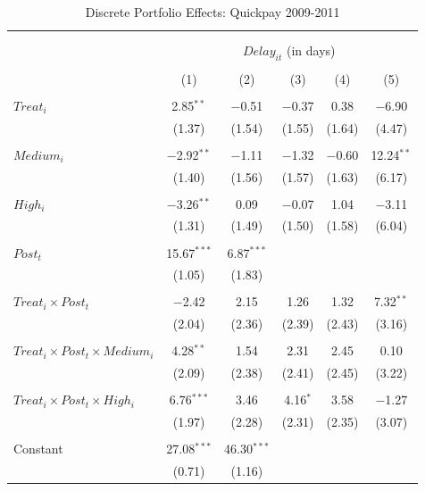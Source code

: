 \documentclass[
]{article}
\begin{document}
\begin{table}[H] \centering 
  \caption{Discrete Portfolio Effects: Quickpay 2009-2011} 
  \label{} 
\small 
\begin{tabular}{@{\extracolsep{-2pt}}lccccc} 
\\[-1.8ex]\hline 
\hline \\[-1.8ex] 
\\[-1.8ex] & \multicolumn{5}{c}{$Delay_{it}$ (in days)} \\ 
\\[-1.8ex] & (1) & (2) & (3) & (4) & (5)\\ 
\hline \\[-1.8ex] 
 $Treat_i$ & 2.85$^{**}$ & $-$0.51 & $-$0.37 & 0.38 & $-$6.90 \\ 
  & (1.37) & (1.54) & (1.55) & (1.64) & (4.47) \\ 
  & & & & & \\ 
 $Medium_i$ & $-$2.92$^{**}$ & $-$1.11 & $-$1.32 & $-$0.60 & 12.24$^{**}$ \\ 
  & (1.40) & (1.56) & (1.57) & (1.63) & (6.17) \\ 
  & & & & & \\ 
 $High_i$ & $-$3.26$^{**}$ & 0.09 & $-$0.07 & 1.04 & $-$3.11 \\ 
  & (1.31) & (1.49) & (1.50) & (1.58) & (6.04) \\ 
  & & & & & \\ 
 $Post_t$ & 15.67$^{***}$ & 6.87$^{***}$ &  &  &  \\ 
  & (1.05) & (1.83) &  &  &  \\ 
  & & & & & \\ 
 $Treat_i \times Post_t$ & $-$2.42 & 2.15 & 1.26 & 1.32 & 7.32$^{**}$ \\ 
  & (2.04) & (2.36) & (2.39) & (2.43) & (3.16) \\ 
  & & & & & \\ 
 $Treat_i \times Post_t \times Medium_i$ & 4.28$^{**}$ & 1.54 & 2.31 & 2.45 & 0.10 \\ 
  & (2.09) & (2.38) & (2.41) & (2.45) & (3.22) \\ 
  & & & & & \\ 
 $Treat_i \times Post_t \times High_i$ & 6.76$^{***}$ & 3.46 & 4.16$^{*}$ & 3.58 & $-$1.27 \\ 
  & (1.97) & (2.28) & (2.31) & (2.35) & (3.07) \\ 
  & & & & & \\ 
 Constant & 27.08$^{***}$ & 46.30$^{***}$ &  &  &  \\ 
  & (0.71) & (1.16) &  &  &  \\ 

\end{tabular}
\end{table}
\end{document}
